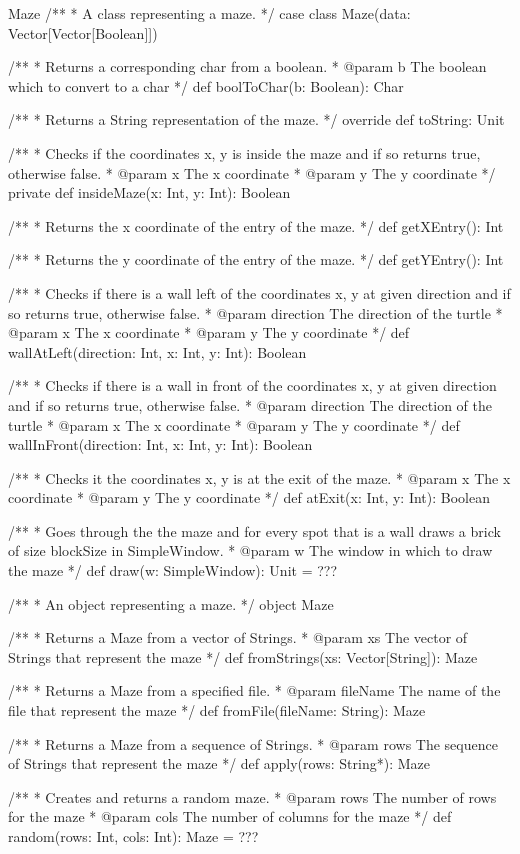 \begin{ScalaSpec}{Maze}
/**
 *  A class representing a maze.
 */
case class Maze(data: Vector[Vector[Boolean]]) {
  
  /**
   *  Returns a corresponding char from a boolean.
   *  @param b	The boolean which to convert to a char
   */
  def boolToChar(b: Boolean): Char

  /**
   *  Returns a String representation of the maze.
   */
  override def toString: Unit

  /**
   *  Checks if the coordinates x, y is inside the maze and if 
   so returns true, otherwise false.
   *  @param x		The x coordinate
   *  @param y		The y coordinate
   */
  private def insideMaze(x: Int, y: Int): Boolean

  /**
   *  Returns the x coordinate of the entry of the maze.
   */
  def getXEntry(): Int

  /**
   * Returns the y coordinate of the entry of the maze.
   */
  def getYEntry(): Int

  /**
   *  Checks if there is a wall left of the coordinates x, y at 
   given direction and if so returns true, otherwise false.
   *  @param direction	The direction of the turtle
   *  @param x					The x coordinate
   *  @param y					The y coordinate
   */
  def wallAtLeft(direction: Int, x: Int, y: Int): Boolean

  /**
   *  Checks if there is a wall in front of the coordinates x, y at 
   given direction and if so returns true, otherwise false.
   *  @param direction	The direction of the turtle
   *  @param x					The x coordinate
   *  @param y					The y coordinate
   */
  def wallInFront(direction: Int, x: Int, y: Int): Boolean

  /**
   *  Checks it the coordinates x, y is at the exit of the maze.
   *  @param x					The x coordinate
   *  @param y					The y coordinate
   */
  def atExit(x: Int, y: Int): Boolean

  /**
   *  Goes through the the maze and for every spot that is a wall 
   draws a brick of size blockSize in SimpleWindow.
   *  @param w		The window in which to draw the maze
   */
  def draw(w: SimpleWindow): Unit = ???
}

/**
 *  An object representing a maze.
 */
object Maze {

  /**
   *  Returns a Maze from a vector of Strings.
   *  @param xs	The vector of Strings that represent the maze
   */
  def fromStrings(xs: Vector[String]): Maze

  /**
   *  Returns a Maze from a specified file.
   *  @param fileName	   The name of the file that represent the maze
   */
  def fromFile(fileName: String): Maze

  /**
   *  Returns a Maze from a sequence of Strings.
   *  @param rows	The sequence of Strings that represent the maze
   */
  def apply(rows: String*): Maze

  /**
   *  Creates and returns a random maze.
   *  @param rows		The number of rows for the maze
   *  @param cols		The number of columns for the maze
   */
  def random(rows: Int, cols: Int): Maze = ???
}

\end{ScalaSpec}

